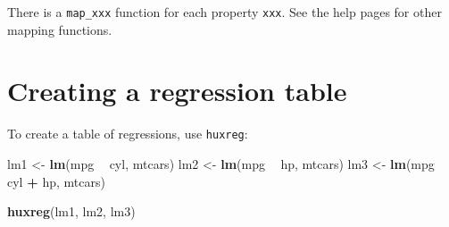 \documentclass[]{article}
\newenvironment{Shaded}{\begin{snugshade}}{\end{snugshade}}
\newcommand{\KeywordTok}[1]{\textcolor[rgb]{0.13,0.29,0.53}{\textbf{#1}}}
\newcommand{\NormalTok}[1]{#1}
\newcommand{\OperatorTok}[1]{\textcolor[rgb]{0.81,0.36,0.00}{\textbf{#1}}}
\newcommand{\StringTok}[1]{\textcolor[rgb]{0.31,0.60,0.02}{#1}}
\begin{document}
\FloatBarrier

There is a \texttt{map\_xxx} function for each property \texttt{xxx}.
See the help pages for other mapping functions.

\hypertarget{creating-a-regression-table}{%
\section{Creating a regression
table}\label{creating-a-regression-table}}

To create a table of regressions, use \texttt{huxreg}:

\begin{Shaded}
\begin{Highlighting}[]
\NormalTok{lm1 <-}\StringTok{ }\KeywordTok{lm}\NormalTok{(mpg }\OperatorTok{~}\StringTok{ }\NormalTok{cyl, mtcars)}
\NormalTok{lm2 <-}\StringTok{ }\KeywordTok{lm}\NormalTok{(mpg }\OperatorTok{~}\StringTok{ }\NormalTok{hp, mtcars)}
\NormalTok{lm3 <-}\StringTok{ }\KeywordTok{lm}\NormalTok{(mpg }\OperatorTok{~}\StringTok{ }\NormalTok{cyl }\OperatorTok{+}\StringTok{ }\NormalTok{hp, mtcars)}

\KeywordTok{huxreg}\NormalTok{(lm1, lm2, lm3)}
\end{Highlighting}
\end{Shaded}

 
  \providecommand{\huxb}[2]{\arrayrulecolor[RGB]{#1}\global\arrayrulewidth=#2pt}
  \providecommand{\huxvb}[2]{\color[RGB]{#1}\vrule width #2pt}
  \providecommand{\huxtpad}[1]{\rule{0pt}{\baselineskip+#1}}
  \providecommand{\huxbpad}[1]{\rule[-#1]{0pt}{#1}}
\end{document}
